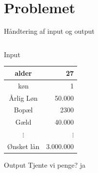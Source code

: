 \documentclass[12pt,t]{beamer}
\begin{document}
\section{Problemet}
\frame{\tableofcontents[currentsection]}
    \begin{frame}[c]{Håndtering af input og output}
        \begin{columns}
            \begin{column}{0.5\textwidth}
                \begin{block}{Input}
                    \begin{center}
                        \begin{tabular}{| c | r |}
                            \hline
                            alder              & 27                \\ \hline
                            køn                & 1                 \\ \hline
                            Årlig Løn          & 50.000            \\ \hline
                            Bopæl              & 2300              \\ \hline
                            Gæld               & 40.000            \\ \hline
                            $\vdots$           & $\vdots$          \\ \hline
                            \alert{Ønsket lån} & \alert{3.000.000} \\ \hline
                        \end{tabular}
                    \end{center}
                \end{block}
                \begin{block}{Output}
                    \centering Tjente vi penge?
                    {\color{KUNATgreen}ja}
                \end{block}
            \end{column}
            \pause


\end{columns}
\end{frame}
\end{document}
